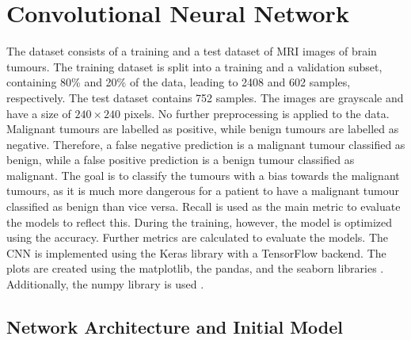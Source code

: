 \chapter{Convolutional Neural Network}
\label{cha:CNN}

The dataset consists of a training and a test dataset of MRI images of brain tumours. 
The training dataset is split into a training and a validation subset, containing 80\% and 20\% of the data, leading to 2408 and 602 samples, respectively.
The test dataset contains 752 samples.
The images are grayscale and have a size of $240 \times 240$ pixels.
No further preprocessing is applied to the data.
Malignant tumours are labelled as positive, while benign tumours are labelled as negative.
Therefore, a false negative prediction is a malignant tumour classified as benign, while a false positive prediction is a benign tumour classified as malignant.
The goal is to classify the tumours with a bias towards the malignant tumours, as it is much more dangerous for a patient to have a malignant tumour classified as benign than vice versa.
Recall is used as the main metric to evaluate the models to reflect this.
During the training, however, the model is optimized using the accuracy.
Further metrics are calculated to evaluate the models. \newline
The CNN is implemented using the Keras \cite{keras} library with a TensorFlow \cite{tensorflow} backend.
The plots are created using the matplotlib, the pandas, and the seaborn libraries \cite{matplotlib, pandas, seaborn}.
Additionally, the numpy library is used \cite{numpy}.

\section{Network Architecture and Initial Model}
\label{sec:initialModel}

